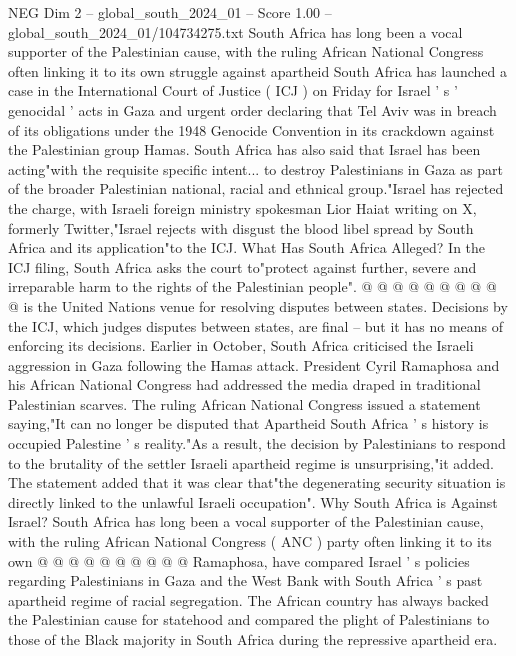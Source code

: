 \begin{textsample}{NEG Dim 2 – global\_south\_2024\_01 – Score 1.00 – global\_south\_2024\_01/104734275.txt}  \label{ex:f2_neg_320}
South Africa has long been a vocal supporter of the Palestinian cause, with the ruling African National Congress often linking it to its own struggle against apartheid South Africa has launched a case in the International Court of Justice ( ICJ ) on Friday for Israel ' s ' genocidal ' acts in Gaza and urgent order declaring that Tel Aviv was in breach of its obligations under the 1948 Genocide Convention in its crackdown against the Palestinian group Hamas.
South Africa has also said that Israel has been acting"with the requisite specific intent... to destroy Palestinians in Gaza as part of the broader Palestinian national, racial and ethnical group."Israel has rejected the charge, with Israeli foreign ministry spokesman Lior Haiat writing on X, formerly Twitter,"Israel rejects with disgust the blood libel spread by South Africa and its application"to the ICJ.
What Has South Africa Alleged?
In the ICJ filing, South Africa asks the court to"protect against further, severe and irreparable harm to the rights of the Palestinian people". @ @ @ @ @ @ @ @ @ @ is the United Nations venue for resolving disputes between states.
Decisions by the ICJ, which judges disputes between states, are final -- but it has no means of enforcing its decisions.
Earlier in October, South Africa criticised the Israeli aggression in Gaza following the Hamas attack.
President Cyril Ramaphosa and his African National Congress had addressed the media draped in traditional Palestinian scarves.
The ruling African National Congress issued a statement saying,"It can no longer be disputed that Apartheid South Africa ' s history is occupied Palestine ' s reality."As a result, the decision by Palestinians to respond to the brutality of the settler Israeli apartheid regime is unsurprising,"it added.
The statement added that it was clear that"the degenerating security situation is directly linked to the unlawful Israeli occupation".
Why South Africa is Against Israel?
South Africa has long been a vocal supporter of the Palestinian cause, with the ruling African National Congress ( ANC ) party often linking it to its own @ @ @ @ @ @ @ @ @ @ Ramaphosa, have compared Israel ' s policies regarding Palestinians in Gaza and the West Bank with South Africa ' s past apartheid regime of racial segregation.
The African country has always backed the Palestinian cause for statehood and compared the plight of Palestinians to those of the Black majority in South Africa during the repressive apartheid era.

\end{textsample}
